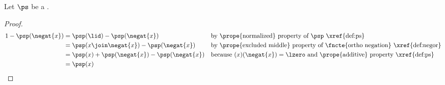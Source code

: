 \begin{proposition}
\label{prop:ps_ortho_xy}
\label{prop:ps_negat}
Let $\ps$ be a  .
\end{proposition}
\begin{proof}
    \begin{align*}
      1-\psp(\negat{x})
        &= \psp(\lid)-\psp(\negat{x})
        && \text{by \prope{normalized} property of $\psp$ \xref{def:ps}}
      \\&= \psp(x\join\negat{x})-\psp(\negat{x})
        && \text{by \prope{excluded middle} property of \fncte{ortho negation} \xref{def:negor}}
      \\&= \psp(x)+\psp(\negat{x})-\psp(\negat{x})
        && \text{because $(x)(\negat{x})=\lzero$ and \prope{additive} property \xref{def:ps}}
      \\&= \psp(x)
    \end{align*}
\end{proof}

